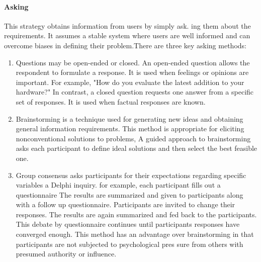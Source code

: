\documentclass[a4paper,12pt]{report}
\begin{document}
\paragraph{Asking} This strategy obtains information from users by simply ask. ing them about the requirements. It assumes a stable system where users are well informed and can overcome biases in defining their problem.There are three key asking methods:
\begin{enumerate}
	\item Questions may be open-ended or closed. An open-ended question allows the respondent to formulate a response. It is used when feelings or opinions are important. For example, "How do you evaluate the latest addition to your hardware?" In contrast, a closed question requests one answer from a specific set of responses. It is used when factual responses are known. 
	\item Brainstorming is a technique used for generating new ideas and obtaining general information requirements. This method is appropriate for eliciting nonconventional solutions to problems, A guided approach to brainstorming asks each participant to define ideal solutions and then select the best feasible one. 
	\item Group consensus asks participants for their expectations regarding specific variables a Delphi inquiry. for example, each participant fills out a questionnaire The results are  summarized and given to participants along with a follow up questionnaire. Participants are invited to change their responses. The results are again summarized and fed back to the participants. This debate by questionnaire continues until participants responses have converged enough. This method has an advantage over brainstorming in that participants are not subjected to psychological pres sure from others with presumed authority or influence.	
\end{enumerate}
\end{document}
